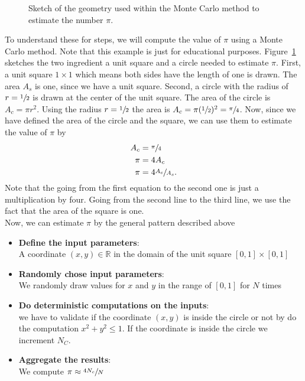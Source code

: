 \begin{figure}[h]
  \begin{center}
  \end{center}
  \caption{Sketch of the geometry used within the Monte Carlo method to estimate the number $\pi$.}
  \label{fig:monte}
\end{figure}
To understand these for steps, we will compute the value of $\pi$ using a Monte Carlo method. Note that this example is just for educational purposes. Figure~\ref{fig:monte} sketches the two ingredient a unit square and a circle needed to estimate $\pi$. First, a unit square $1 \times 1$ which means both sides have the length of one is drawn. The area $A_s$ is one, since we have a unit square. Second, a circle with the radius of $r=\sfrac{1}{2}$ is drawn at the center of the unit square. The area of the circle is $A_c=\pi r^2$. Using the radius $r=\sfrac{1}{2}$ the area is $A_c=\pi(\sfrac{1}{2})^2=\sfrac{\pi}{4}$. Now, since we have defined the area of the circle and the square, we can use them to estimate the value of $\pi$ by
\begin{align}
A_c &= \sfrac{\pi}{4} \notag\\
\pi &= 4 A_c \notag\\
\pi &= 4 \sfrac{A_c}{A_s}\text{.}
\end{align}
Note that the going from the first equation to the second one is just a multiplication by four. Going from the second line to the third line, we use the fact that the area of the square is one. \\

Now, we can estimate $\pi$ by the general pattern described above
\begin{itemize}
\item \textbf{Define the input parameters}: \\ A coordinate  $(x,y)\in\mathbb{R}$ in the domain of the unit square $[0,1]\times [0,1]$
\item\textbf{ Randomly chose input parameters}:\\ We randomly draw values for $x$ and $y$ in the range of $[0,1]$ for $N$ times
\item \textbf{Do deterministic computations on the inputs}:  \\
we have to validate if the coordinate $(x,y)$ is inside the circle or not by do the computation $x^2+y^2\leq 1$. If the coordinate is inside the circle we increment $N_C$.
\item \textbf{Aggregate the results}: \\
We compute $\pi\approx \sfrac{4N_c}{N}$
\end{itemize}
\vspace{0.25cm}

